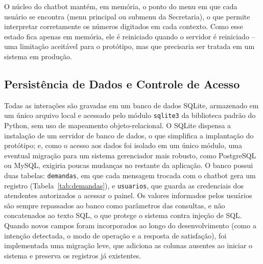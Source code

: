 \documentclass[12pt]{article}
\begin{document}
O núcleo do chatbot mantém, em memória, o ponto do menu em que cada usuário se
encontra (menu principal ou submenu da Secretaria), o que permite interpretar
corretamente os números digitados em cada contexto. Como esse estado fica
apenas em memória, ele é reiniciado quando o servidor é reiniciado -- uma
limitação aceitável para o protótipo, mas que precisaria ser tratada em um
sistema em produção.

\subsection{Persistência de Dados e Controle de Acesso}\label{sec:dados}

Todas as interações são gravadas em um banco de dados SQLite, armazenado em um
único arquivo local e acessado pelo módulo \texttt{sqlite3} da biblioteca
padrão do Python, sem uso de mapeamento objeto-relacional. O SQLite dispensa a
instalação de um servidor de banco de dados, o que simplifica a implantação do
protótipo; e, como o acesso aos dados foi isolado em um único módulo, uma
eventual migração para um sistema gerenciador mais robusto, como PostgreSQL ou
MySQL, exigiria poucas mudanças no restante da aplicação. O banco possui duas
tabelas: \texttt{demandas}, em que cada mensagem trocada com o chatbot gera um
registro (Tabela~\ref{tab:demandas}), e \texttt{usuarios}, que guarda as
credenciais dos atendentes autorizados a acessar o painel. Os valores
informados pelos usuários são sempre repassados ao banco como parâmetros das
consultas, e não concatenados ao texto SQL, o que protege o sistema contra
injeção de SQL. Quando novos campos foram incorporados ao longo do
desenvolvimento (como a intenção detectada, o modo de operação e a resposta de
satisfação), foi implementada uma migração leve, que adiciona as colunas
ausentes ao iniciar o sistema e preserva os registros já existentes.
\end{document}
